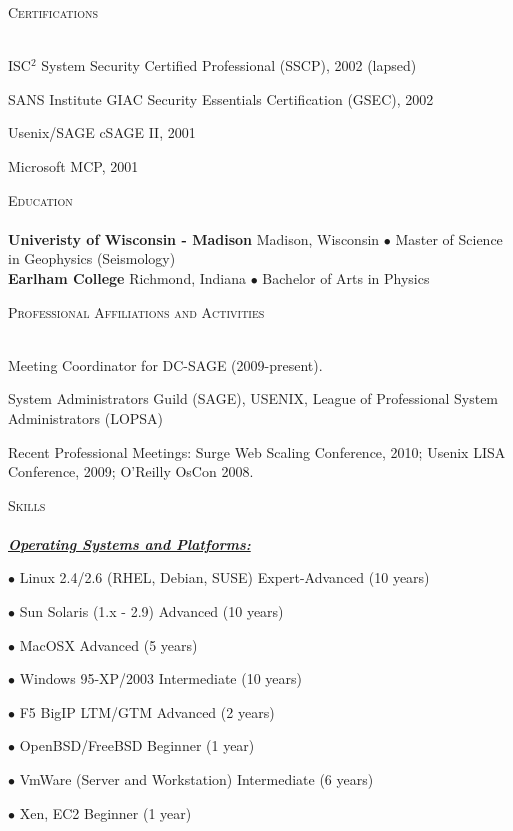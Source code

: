 \documentclass{article}
\newcommand{\lineunder}{\vspace*{-8pt} \\ \hspace*{-18pt} \hrulefill \\}
\newcommand{\header}[1]{{\hspace*{-15pt}\vspace*{6pt} \textsc{#1}} \vspace*{-6pt} \lineunder}
\newcommand{\skillset}[1]{{ \underline{\textbf{\emph{#1}}}\\  \nopagebreak }}
\newcommand{\skill}[2]{{$\bullet$ #1 \hfill #2 }}
\newenvironment{achievements}{\begin{list}{\topsep 0pt \itemsep -2pt}} {\vspace*{4pt}\end{list}}
\newcommand{\school}[3]{
 \textbf{#1} #2 $\bullet$ #3\\ 
}
\begin{document}
\header{Certifications}
\begin{achievements}
\item ISC$^{2}$ System Security Certified Professional (SSCP), 2002 (lapsed)
\item SANS Institute GIAC Security Essentials Certification (GSEC), 2002
\item Usenix/SAGE cSAGE II, 2001
\item Microsoft MCP, 2001
\end{achievements}

\header{Education}

\school{Univeristy of Wisconsin - Madison}{Madison, Wisconsin} {Master of Science in Geophysics (Seismology)}
\school{Earlham College}{Richmond, Indiana}{Bachelor of Arts in Physics}
\vspace{18pt}

\header{Professional Affiliations and Activities}
\begin{achievements}
\item Meeting Coordinator for DC-SAGE (2009-present).  
\item System Administrators Guild (SAGE), USENIX, League of Professional System Administrators (LOPSA) 
\item Recent Professional Meetings: Surge Web Scaling Conference, 2010; Usenix LISA Conference, 2009; O'Reilly OsCon 2008.
\end{achievements}


\pagebreak
\header{Skills}

\skillset{Operating Systems and Platforms: }

\skill{Linux 2.4/2.6 (RHEL, Debian, SUSE)}{Expert-Advanced (10 years)}

\skill{Sun Solaris (1.x - 2.9)}{Advanced (10 years)}

\skill{MacOSX}{Advanced (5 years)}

\skill{Windows 95-XP/2003}{Intermediate (10 years)}

\skill{F5 BigIP LTM/GTM}{Advanced (2 years)}

\skill{OpenBSD/FreeBSD}{Beginner (1 year)}

\skill{VmWare (Server and Workstation)}{Intermediate (6 years)}

\skill{Xen, EC2}{Beginner (1 year)}
\end{document}
